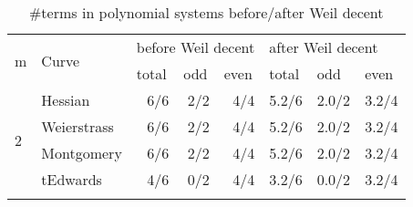 
\begin{table}[!h]
\centering
\caption{\#terms in polynomial systems before/after Weil decent}
\label{tb:terms}
\begin{tabular}{llrrrrrr}
\hline
\multicolumn{1}{|l|}{\multirow{2}{*}{m}} & \multicolumn{1}{l|}{\multirow{2}{*}{Curve}} & \multicolumn{3}{l|}{before Weil decent}                                                    & \multicolumn{3}{l|}{after Weil decent}                                                           \\ \cline{3-8} 
\multicolumn{1}{|l|}{}                   & \multicolumn{1}{l|}{}                       & \multicolumn{1}{l|}{total}   & \multicolumn{1}{l|}{odd}     & \multicolumn{1}{l|}{even}    & \multicolumn{1}{l|}{total}     & \multicolumn{1}{l|}{odd}       & \multicolumn{1}{l|}{even}      \\ \hline
\multicolumn{1}{|l|}{\multirow{4}{*}{2}} & \multicolumn{1}{l|}{Hessian}                & \multicolumn{1}{r|}{6/6}     & \multicolumn{1}{r|}{2/2}     & \multicolumn{1}{r|}{4/4}     & \multicolumn{1}{r|}{5.2/6}     & \multicolumn{1}{r|}{2.0/2}     & \multicolumn{1}{r|}{3.2/4}     \\ \cline{2-8} 
\multicolumn{1}{|l|}{}                   & \multicolumn{1}{l|}{Weierstrass}            & \multicolumn{1}{r|}{6/6}     & \multicolumn{1}{r|}{2/2}     & \multicolumn{1}{r|}{4/4}     & \multicolumn{1}{r|}{5.2/6}     & \multicolumn{1}{r|}{2.0/2}     & \multicolumn{1}{r|}{3.2/4}     \\ \cline{2-8} 
\multicolumn{1}{|l|}{}                   & \multicolumn{1}{l|}{Montgomery}             & \multicolumn{1}{r|}{6/6}     & \multicolumn{1}{r|}{2/2}     & \multicolumn{1}{r|}{4/4}     & \multicolumn{1}{r|}{5.2/6}     & \multicolumn{1}{r|}{2.0/2}     & \multicolumn{1}{r|}{3.2/4}     \\ \cline{2-8} 
\multicolumn{1}{|l|}{}                   & \multicolumn{1}{l|}{tEdwards}               & \multicolumn{1}{r|}{4/6}     & \multicolumn{1}{r|}{0/2}     & \multicolumn{1}{r|}{4/4}     & \multicolumn{1}{r|}{3.2/6}     & \multicolumn{1}{r|}{0.0/2}     & \multicolumn{1}{r|}{3.2/4}     \\ \hline  \vspace{-3mm}
                                         &                                             &                              &                              &                              &                                &                                &                                \\ \hline

\end{tabular}
\end{table}
